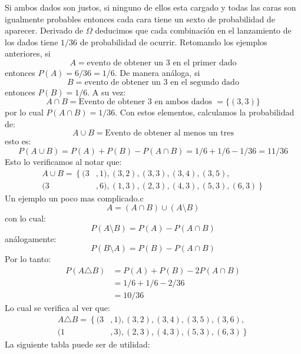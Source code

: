 \documentclass[14pt]{extreport}
\theoremstyle{definicion}
\theoremstyle{propiedad}
\begin{document}
Si ambos dados son justos, si ninguno de ellos esta cargado y todas las caras son igualmente probables entonces cada cara tiene un sexto de probabilidad de aparecer. Derivado de $\Omega$ deducimos que cada combinación en el lanzamiento de los dados tiene $1/36$ de probabilidad de ocurrir. Retomando los ejemplos anteriores, si
$$
  A = \text{evento de obtener un 3 en el primer dado}
$$
entonces $P(A) = 6/36 = 1/6$. De manera análoga, si
$$
  B = \text{evento de obtener un 3 en el segundo dado}
$$
entonces $P(B) = 1/6$. A su vez:
$$
  A \cap B = \text{Evento de obtener 3 en ambos dados } = \{(3, 3)\}
$$
por lo cual $P(A \cap B) = 1/36$. Con estos elementos, calculamos la
probabilidad de:
$$
  A \cup B = \text{Evento de obtener al menos un tres}
$$
esto es:
$$
  P(A \cup B) = P(A) + P(B) - P(A \cap B) =  1/6 + 1/ 6 - 1/36 = 11/36
$$
Esto lo verificamos al notar que:
\begin{equation*}
  \begin{split}
    A \cup B = \left\{\right.(3&, 1), (3, 2), (3, 3), (3,4), (3, 5),\\
    (3&, 6), (1, 3), (2, 3), (4, 3), (5, 3), (6, 3)\left.\right\}
  \end{split}
\end{equation*}
Un ejemplo un poco mas complicado.c
$$
  A = (A \cap B) \cup (A \setminus B)
$$
con lo cual:
$$
  P(A \setminus B) = P(A) - P(A \cap B)
$$
análogamente:
$$
  P(B \setminus A) = P(B) - P(A \cap B)
$$
Por lo tanto:
\begin{equation*}
  \begin{split}
    P(A \triangle B) & = P(A) + P(B) - 2P(A \cap B) \\
    & = 1/6 + 1/6 -2/36 \\
    & = 10/36
  \end{split}
\end{equation*}
Lo cual se verifica al ver que:
\begin{equation*}
  \begin{split}
    A \triangle B = \left\{\right. (3&, 1), (3, 2),(3, 4), (3, 5), (3, 6),\\
    (1&, 3), (2, 3), (4, 3), (5, 3), (6, 3)\left.\right\}
  \end{split}
\end{equation*}
La siguiente tabla puede ser de utilidad:
\renewcommand{\arraystretch}{1.5}
\end{document}
